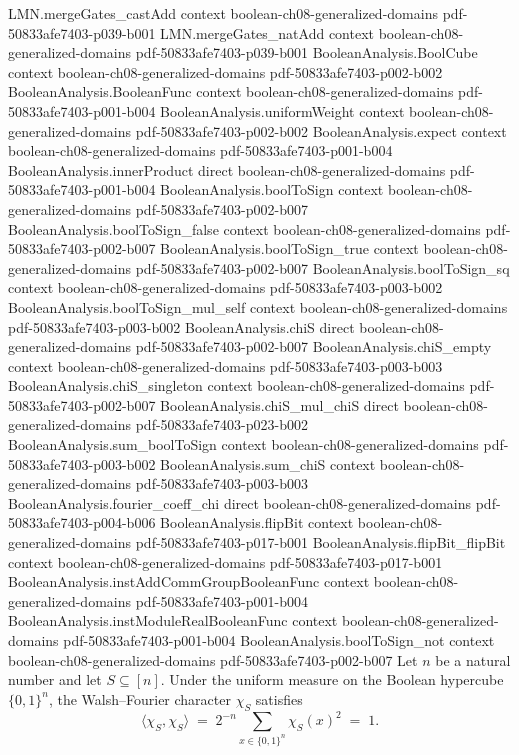 \begin{lemma}
  {LMN.mergeGates_castAdd}
  {context}
  {boolean-ch08-generalized-domains}
  {pdf-50833afe7403-p039-b001}
\proofstep
  {LMN.mergeGates_natAdd}
  {context}
  {boolean-ch08-generalized-domains}
  {pdf-50833afe7403-p039-b001}
\proofstep
  {BooleanAnalysis.BoolCube}
  {context}
  {boolean-ch08-generalized-domains}
  {pdf-50833afe7403-p002-b002}
\proofstep
  {BooleanAnalysis.BooleanFunc}
  {context}
  {boolean-ch08-generalized-domains}
  {pdf-50833afe7403-p001-b004}
\proofstep
  {BooleanAnalysis.uniformWeight}
  {context}
  {boolean-ch08-generalized-domains}
  {pdf-50833afe7403-p002-b002}
\proofstep
  {BooleanAnalysis.expect}
  {context}
  {boolean-ch08-generalized-domains}
  {pdf-50833afe7403-p001-b004}
\proofstep
  {BooleanAnalysis.innerProduct}
  {direct}
  {boolean-ch08-generalized-domains}
  {pdf-50833afe7403-p001-b004}
\proofstep
  {BooleanAnalysis.boolToSign}
  {context}
  {boolean-ch08-generalized-domains}
  {pdf-50833afe7403-p002-b007}
\proofstep
  {BooleanAnalysis.boolToSign_false}
  {context}
  {boolean-ch08-generalized-domains}
  {pdf-50833afe7403-p002-b007}
\proofstep
  {BooleanAnalysis.boolToSign_true}
  {context}
  {boolean-ch08-generalized-domains}
  {pdf-50833afe7403-p002-b007}
\proofstep
  {BooleanAnalysis.boolToSign_sq}
  {context}
  {boolean-ch08-generalized-domains}
  {pdf-50833afe7403-p003-b002}
\proofstep
  {BooleanAnalysis.boolToSign_mul_self}
  {context}
  {boolean-ch08-generalized-domains}
  {pdf-50833afe7403-p003-b002}
\proofstep
  {BooleanAnalysis.chiS}
  {direct}
  {boolean-ch08-generalized-domains}
  {pdf-50833afe7403-p002-b007}
\proofstep
  {BooleanAnalysis.chiS_empty}
  {context}
  {boolean-ch08-generalized-domains}
  {pdf-50833afe7403-p003-b003}
\proofstep
  {BooleanAnalysis.chiS_singleton}
  {context}
  {boolean-ch08-generalized-domains}
  {pdf-50833afe7403-p002-b007}
\proofstep
  {BooleanAnalysis.chiS_mul_chiS}
  {direct}
  {boolean-ch08-generalized-domains}
  {pdf-50833afe7403-p023-b002}
\proofstep
  {BooleanAnalysis.sum_boolToSign}
  {context}
  {boolean-ch08-generalized-domains}
  {pdf-50833afe7403-p003-b002}
\proofstep
  {BooleanAnalysis.sum_chiS}
  {context}
  {boolean-ch08-generalized-domains}
  {pdf-50833afe7403-p003-b003}
\proofstep
  {BooleanAnalysis.fourier_coeff_chi}
  {direct}
  {boolean-ch08-generalized-domains}
  {pdf-50833afe7403-p004-b006}
\proofstep
  {BooleanAnalysis.flipBit}
  {context}
  {boolean-ch08-generalized-domains}
  {pdf-50833afe7403-p017-b001}
\proofstep
  {BooleanAnalysis.flipBit_flipBit}
  {context}
  {boolean-ch08-generalized-domains}
  {pdf-50833afe7403-p017-b001}
\proofstep
  {BooleanAnalysis.instAddCommGroupBooleanFunc}
  {context}
  {boolean-ch08-generalized-domains}
  {pdf-50833afe7403-p001-b004}
\proofstep
  {BooleanAnalysis.instModuleRealBooleanFunc}
  {context}
  {boolean-ch08-generalized-domains}
  {pdf-50833afe7403-p001-b004}
\proofstep
  {BooleanAnalysis.boolToSign_not}
  {context}
  {boolean-ch08-generalized-domains}
  {pdf-50833afe7403-p002-b007}
Let $n$ be a natural number and let $S \subseteq [n]$. Under the uniform measure on the
Boolean hypercube $\{0,1\}^n$, the Walsh--Fourier character $\chi_S$ satisfies
\[
  \langle \chi_S, \chi_S\rangle \;=\; 2^{-n}\sum_{x\in\{0,1\}^n} \chi_S(x)^2 \;=\; 1.
\]
\end{lemma}

